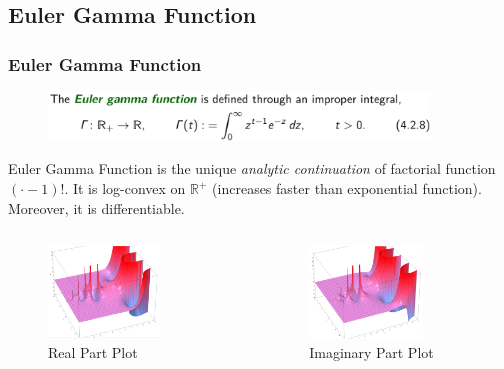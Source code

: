 \documentclass[10pt, t]{beamer}
\renewcommand{\emph}[1]{{\color{themecolor}\textsl{#1}}}
\newcommand{\R}{\mathbb{R}}
\begin{document}
\subsection{Euler Gamma Function}
\begin{frame}
    \frametitle{Euler Gamma Function}
    \begin{figure}[H]
        \centering
        \includegraphics[width=0.9\textwidth]{2020-12-02-14-11-31.png}
    \end{figure}
    Euler Gamma Function is the unique \emph{analytic continuation} of factorial function $(\cdot - 1)!$. It is log-convex on $\R^+$ (increases faster than exponential function). Moreover, it is differentiable.
    \begin{columns}
        \begin{column}{0.5\textwidth}
            \begin{figure}[H]
                \centering
                \includegraphics[width=0.7\textwidth]{2020-12-02-14-15-47.png}
                \caption{Real Part Plot}
            \end{figure}
        \end{column}
        \begin{column}{0.5\textwidth}
            \begin{figure}[H]
                \centering
                \includegraphics[width=0.7\textwidth]{2020-12-02-14-16-12.png}
                \caption{Imaginary Part Plot}
            \end{figure}
        \end{column}
    \end{columns}
\end{frame}
\end{document}
